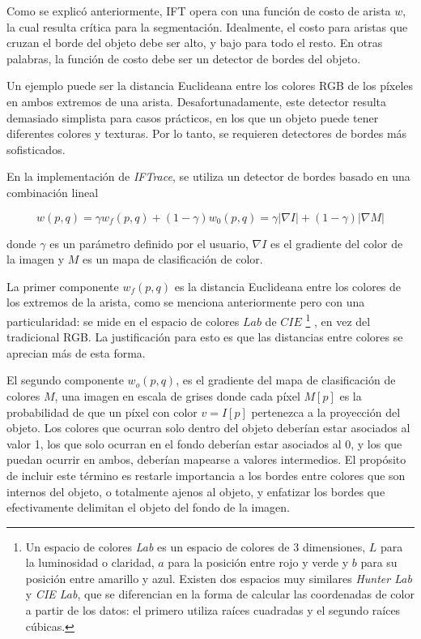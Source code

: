 \documentclass[a4paper,10pt]{article}
\begin{document}
Como se explicó anteriormente, IFT opera con una función de costo de arista
$w$, la cual resulta crítica para la segmentación. Idealmente, el costo 
para aristas que cruzan el borde del objeto debe ser alto, y bajo para todo
el resto. En otras palabras, la función de costo debe ser un detector
de bordes del objeto.

Un ejemplo puede ser la distancia Euclideana entre los colores RGB de los píxeles 
en ambos extremos de una arista. Desafortunadamente, este detector resulta demasiado 
simplista para casos prácticos, en los que un objeto puede tener diferentes colores y 
texturas. Por lo tanto, se requieren detectores de bordes más sofisticados.

En la implementación de \textit{IFTrace}, se utiliza un detector de bordes basado en
una combinación lineal

\begin{equation}
   \label{eq:IFTrace-edge-detector}
   w(p,q) = \gamma w_{f}(p,q) + (1 - \gamma)w_{0}(p,q) = \gamma |\nabla I| + (1 - \gamma)|\nabla M|
\end{equation}

donde $\gamma$ es un parámetro definido por el usuario, $\nabla I$ es el gradiente
del color de la imagen y $M$ es un mapa de clasificación de color.

La primer componente $w_{f}(p,q)$ es la distancia Euclideana entre los colores de 
los extremos de la arista, como se menciona anteriormente pero con una particularidad:
se mide en el espacio de colores $Lab$ de $CIE$
\footnote{
Un espacio de colores \textit{Lab} es un espacio de colores de 3 dimensiones, $L$ para la luminosidad o claridad, $a$ para la posición entre rojo y verde y 
$b$ para su posición entre amarillo y azul. Existen dos espacios muy similares \textit{Hunter Lab} y \textit{CIE Lab}, que se diferencian en la forma de 
calcular las coordenadas de color a partir de los datos: el primero utiliza raíces cuadradas y el segundo raíces cúbicas.}
, en vez del tradicional RGB. La 
justificación para esto es que las distancias entre colores se aprecian más de 
esta forma. %

El segundo componente $w_{o}(p,q)$, es el gradiente del mapa de clasificación
de colores $M$, una imagen en escala de grises donde cada píxel $M[p]$ es
la probabilidad de que un píxel con color $v=I[p]$ pertenezca a la proyección
del objeto. Los colores que ocurran solo dentro del objeto deberían estar
asociados al valor 1, los que solo ocurran en el fondo deberían estar 
asociados al 0, y los que puedan ocurrir en ambos, deberían mapearse a 
valores intermedios. El propósito de incluir este término es restarle 
importancia a los bordes entre colores que son internos del objeto, o 
totalmente ajenos al objeto, y enfatizar los bordes que efectivamente 
delimitan el objeto del fondo de la imagen.
\end{document}
